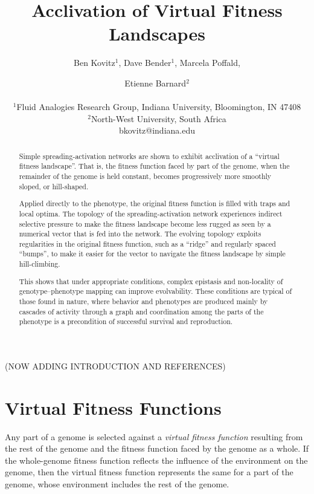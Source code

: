 \documentclass[letterpaper]{article}
\title{Acclivation of Virtual Fitness Landscapes}
\author{Ben Kovitz$^{1}$, Dave Bender$^{1}$, Marcela Poffald, \and Etienne
Barnard$^{2}$ \\
\mbox{}\\
$^1$Fluid Analogies Research Group, Indiana University, Bloomington, IN 47408 \\
$^2$North-West University, South Africa \\
bkovitz@indiana.edu}
\begin{document}
\maketitle

\begin{abstract}
Simple spreading-activation networks are shown to exhibit acclivation of a
``virtual fitness landscape''. That is, the fitness function faced by part of
the genome, when the remainder of the genome is held constant, becomes
progressively more smoothly sloped, or hill-shaped.

Applied directly to the phenotype, the original fitness function is filled
with traps and local optima. The topology of the spreading-activation network
experiences indirect selective pressure to make the fitness landscape become
less rugged as seen by a numerical vector that is fed into the network.
The evolving topology exploits regularities in the original fitness
function, such as a ``ridge'' and regularly spaced ``bumps'', to make it
easier for the vector to navigate the fitness landscape by simple
hill-climbing.

This shows that under appropriate conditions, complex \mbox{epistasis} and
non-locality of genotype--phenotype mapping can improve evolvability. These
conditions are typical of those found in nature, where behavior and phenotypes
are produced mainly by cascades of activity through a graph and coordination
among the parts of the phenotype is a precondition of successful survival and
reproduction.

\end{abstract}

%

(NOW ADDING INTRODUCTION AND REFERENCES)

\section{Virtual Fitness Functions}

Any part of a genome is selected against a \textit{virtual fitness function}
resulting from the rest of the genome and the fitness function faced by the
genome as a whole. If the whole-genome fitness function reflects the influence
of the environment on the genome, then the virtual fitness function represents
the same for a part of the genome, whose environment includes the rest of
the genome.
\end{document}
